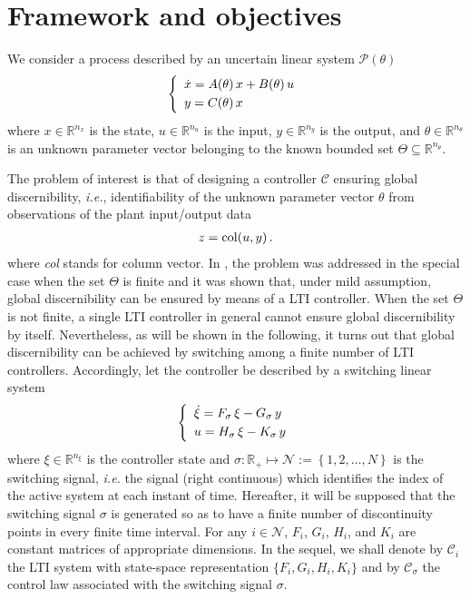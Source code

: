 \documentclass[letterpaper, 10 pt, conference]{ieeetran}
\begin{document}
\section{Framework and objectives}\label{overview}


We consider a process described by an uncertain linear system  $\mathcal P(\theta)$
\begin{eqnarray} \label{equazione:sistema}
\left\{ \begin{array}{l} \dot x =
A(\theta) \, x + B(\theta) \, u \vspace{0.1cm} \\
y =   C(\theta) \, x \end{array} \right.\, 
\end{eqnarray}
where $x \in {\mathbb R}^{n_x}$ is the state, 
$u \in {\mathbb R}^{n_u}$ is the input, $y \in {\mathbb R}^{n_y}$ 
is the output, and $\theta \in {\mathbb R}^{n_\theta}$ is 
an unknown parameter vector belonging to the known
bounded set $\Theta \subseteq {\mathbb R}^{n_\theta}$.

The problem of interest is that of designing a controller $\mathcal C$
ensuring global discernibility, \emph{i.e.}, identifiability of 
the unknown parameter vector $\theta$ from observations of the plant input/output data 
\begin{eqnarray}
z = {\rm col}(u,y) \,. \nonumber
\end{eqnarray}
where {\em col} stands for column vector. 
In \cite{BaBaTe14}, the problem was addressed in the special case when the set $\Theta$ is finite and it was shown that, 
under mild assumption, global discernibility can be ensured by means of a LTI controller. When the set $\Theta$ is not finite, a single LTI controller
in general cannot ensure global discernibility by itself. Nevertheless, as will be shown in the following, it turns out that global discernibility can be achieved
by switching among a finite number of LTI controllers. Accordingly, let the controller be described by a switching linear system
\begin{eqnarray}
\left\{ \begin{array}{l} 
\dot \xi = F_{\sigma} \, \xi - G_{\sigma} \, y \vspace{0.1cm} \\
u = H_{\sigma} \, \xi - K_{\sigma} \, y
\end{array} \right.
\label{equazione:controllore}
\end{eqnarray}where $\xi \in {\mathbb R}^{n_{\xi}}$ is the controller state and
$\sigma:{\mathbb R}_+ \mapsto {\mathcal N}
:= \left\{ 1,2,\ldots, N\right\}$ is the 
switching signal, \emph{i.e.} the signal 
(right continuous) which identifies 
the index of the active system at each instant of time. Hereafter, it will be supposed that the switching signal $\sigma$
is generated so as to have a finite number of discontinuity points in every finite time interval.
For any $i \in \mathcal N$, $F_i$, $G_i$, $H_i$, and $K_i$ are constant matrices of appropriate dimensions.
In the sequel, we shall denote 
by $\mathcal C_i$ the LTI system with state-space representation $\{F_i,G_i,H_i,K_i\}$ and by $\mathcal C_\sigma$
the control law associated with the switching signal $\sigma$.
\end{document}
